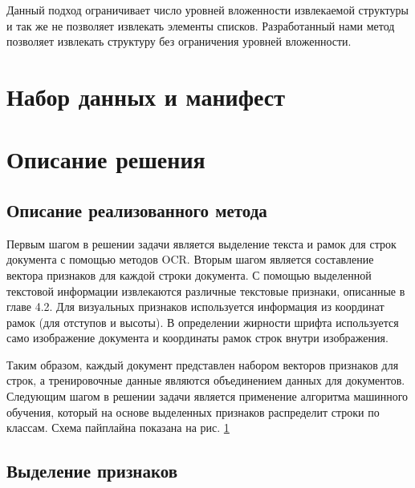 \documentclass{ProcISPRAS}
\begin{document}
Данный подход ограничивает число уровней вложенности извлекаемой структуры и так же не позволяет извлекать элементы списков. Разработанный нами метод позволяет извлекать структуру без ограничения уровней вложенности.

\section{Набор данных и манифест}



\section{Описание решения}

\subsection{Описание реализованного метода}

Первым шагом в решении задачи является выделение текста и рамок для строк документа с помощью методов OCR. Вторым шагом является составление вектора признаков для каждой строки документа. С помощью выделенной текстовой информации извлекаются различные текстовые признаки, описанные в главе 4.2. Для визуальных признаков используется информация из координат рамок (для отступов и высоты). В определении жирности шрифта используется само изображение документа и координаты рамок строк внутри изображения.

Таким образом, каждый документ представлен набором векторов признаков для строк, а тренировочные данные являются объединением данных для документов.
Следующим шагом в решении задачи является применение алгоритма машинного обучения, который на основе выделенных признаков распределит строки по классам. Схема пайплайна показана на рис. \ref{fig:pipeline}

\begin{figure}[ht]
    \label{fig:pipeline}
\end{figure}

\subsection{Выделение признаков}
\end{document}
